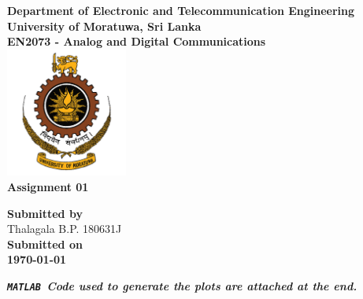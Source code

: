 \begin{titlepage}
\center %

\textbf{\large Department of Electronic and Telecommunication Engineering}\\[0.5cm]
\textbf{\Large University of Moratuwa, Sri Lanka}\\[1cm]
\textbf{\large EN2073 - Analog and Digital Communications}\\[2cm]
\includegraphics[width=0.3\textwidth]{figures/uomlogo}\\[2cm]

	
\textbf{\Huge Assignment 01 } \\[5cm]




\vfill

\textbf{\large Submitted by}\\[0.5cm]

{\large Thalagala B.P.}	\hspace{5mm} {\large 180631J }\\[1cm]


\textbf{\large Submitted on}\\[0.5cm]
\textbf{\Large \today} %


\vfill %
\begin{center}
	
	\textbf{\textit{ \large * {\tt MATLAB }Code used to generate the plots are attached at the end.}}
\end{center}

\end{titlepage}
